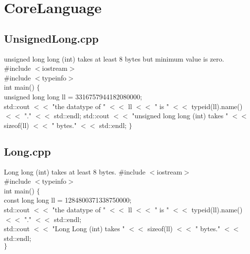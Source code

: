 \documentclass[12pt,a4paper]{report}
\begin{document}
\section{CoreLanguage}
\label{Appendix: corelanguage}
\subsection{UnsignedLong.cpp}
\label{Appendix B: unsignedLong}
{\scriptsize unsigned long long (int) takes at least 8 bytes but minimum value is zero.}
\newline
{\scriptsize
\#include $<$iostream$>$ \\
\#include $<$typeinfo$>$ \\
\newline
int main() $\lbrace$\\
  unsigned long long ll = 3316757944182080000;\\
\newline
  std::cout $<<$ "the datatype of " $<<$ ll $<<$ " is " $<<$ typeid(ll).name() $<<$ "." $ <<$ std::endl;
\newline
  std::cout $<<$ "unsigned long long (int) takes " $<<$ sizeof(ll) $<<$ " bytes." $<<$ std::endl;
\newline
$\rbrace$
}
\subsection{Long.cpp}
\label{LongLong}
{\scriptsize Long long (int) takes at least 8 bytes.}
\newline
{\scriptsize
\#include $<$iostream$>$\\
\#include $<$typeinfo$>$\\
\newline
int main() $\lbrace$\\
  const long long ll = 1284800371338750000;\\
\newline
std::cout $<<$ "the datatype of " $<<$ ll $<<$ " is " $<<$ typeid(ll).name() $<<$ "." $ <<$ std::endl;\\
std::cout $<<$ "Long Long (int) takes " $<<$ sizeof(ll) $<<$ " bytes." $<<$ std::endl;\\
$\rbrace$
}
\end{document}
